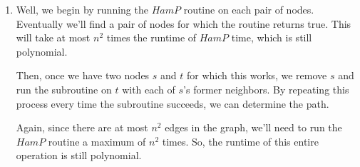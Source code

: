 \documentclass[12pt]{article}
\begin{document}
\begin{enumerate}
\item
  
  Well, we begin by running the $HamP$ routine on each pair of nodes. 
  Eventually we'll find a pair of nodes for which the routine returns true.
  This will take at most $n^2$ times the runtime of $HamP$ time, which is still
  polynomial.

  Then, once we have two nodes $s$ and $t$ for which this works, we remove $s$
  and run the subroutine on $t$ with each of $s$'s former neighbors. By 
  repeating this process every time the subroutine succeeds, we can determine
  the path.

  Again, since there are at most $n^2$ edges in the graph, we'll need to run the
  $HamP$ routine a maximum of $n^2$ times. So, the runtime of this entire
  operation is still polynomial.

\end{enumerate}
\end{document}

